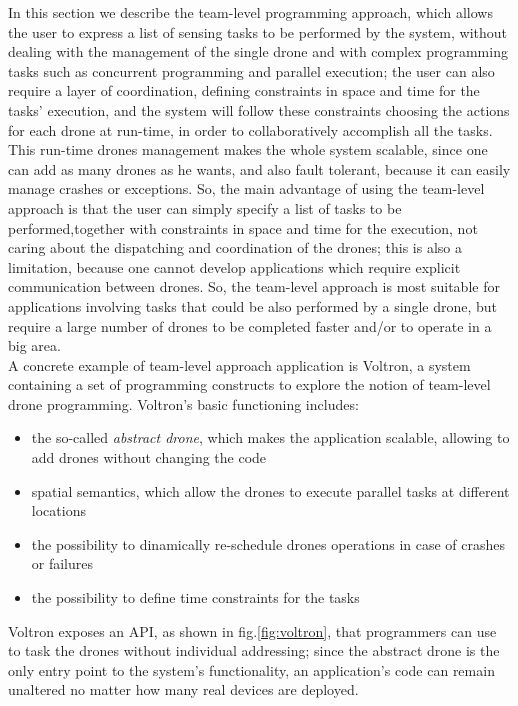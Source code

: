 In this section we describe the team-level programming approach\cite{voltron}, which allows the user to express a list of sensing tasks to be performed by the system, without dealing with the management of the single drone and with complex programming tasks such as concurrent programming and parallel execution; the user can also require a layer of coordination, defining constraints in space and time for the tasks' execution, and the system will follow these constraints choosing the actions for each drone at run-time, in order to collaboratively accomplish all the tasks.
This run-time drones management makes the whole system scalable, since one can add as many drones as he wants, and also fault tolerant, because it can easily manage crashes or exceptions.
So, the main advantage of using the team-level approach is that the user can simply specify a list of tasks to be performed,together with constraints in space and time for the execution, not caring about the dispatching and coordination of the drones; this is also a limitation, because one cannot develop applications which require explicit communication between drones.
So, the team-level approach is most suitable for applications involving tasks that could be also performed by a single drone, but require a large number of drones to be completed faster and/or to operate in a big area.
\\

A concrete example of team-level approach application is Voltron\cite{voltron}, a system containing a set of programming constructs to explore the notion of team-level drone programming. 
Voltron's\cite{voltron} basic functioning includes:

\begin{itemize}
\itemsep2pt
\item{
the so-called \textit{abstract drone}, which makes the application scalable, allowing to add drones without changing the code
}
\item{spatial semantics, which allow the drones to execute parallel tasks at different locations
}
\item{
the possibility to dinamically re-schedule drones operations in case of crashes or failures
}
\item{
the possibility to define time constraints for the tasks 
}
\end{itemize}

Voltron\cite{voltron} exposes an API, as shown in fig.\ref{fig:voltron}, that programmers can use to task the drones without individual addressing; since the abstract drone is the only entry point to the system’s functionality, an application’s code can remain unaltered no matter how many real devices are deployed.
\\

